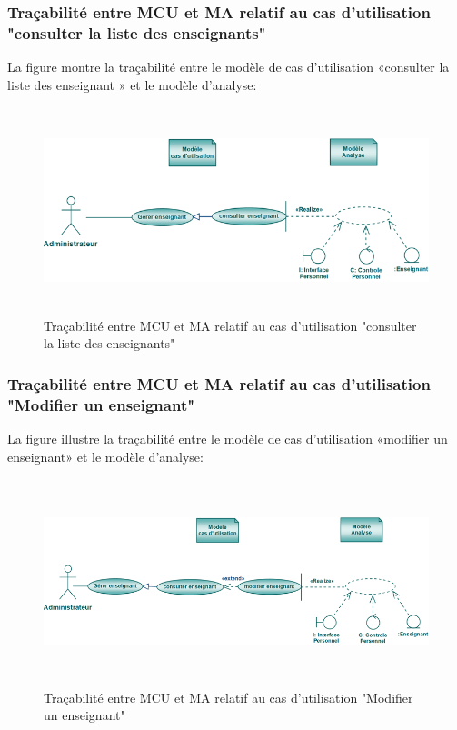 \documentclass[12 pt ]{report}
\begin{document}
\subsubsection{Traçabilité entre MCU et MA relatif au cas d’utilisation "consulter la liste des enseignants" }
La figure  montre la traçabilité entre le modèle de cas d’utilisation «consulter la liste des enseignant » et le modèle
d’analyse:
\begin{figure}[h]
\begin{center}
\includegraphics[width= 13cm , height =6cm]{traconsens.png}
\caption{Traçabilité entre MCU et MA relatif au cas d’utilisation "consulter la liste des enseignants"}
\end{center}
\end{figure} 



\subsubsection{Traçabilité entre MCU et MA relatif au cas d’utilisation "Modifier un enseignant" }
La figure  illustre la traçabilité entre le modèle de cas d’utilisation «modifier un enseignant» et le modèle
d’analyse:
\begin{figure}[h]
\begin{center}
\includegraphics[width= 13cm , height =6cm]{mod_ens.png}
\caption{Traçabilité entre MCU et MA relatif au cas d’utilisation "Modifier un enseignant"}
\end{center}
\end{figure} 
\end{document}
